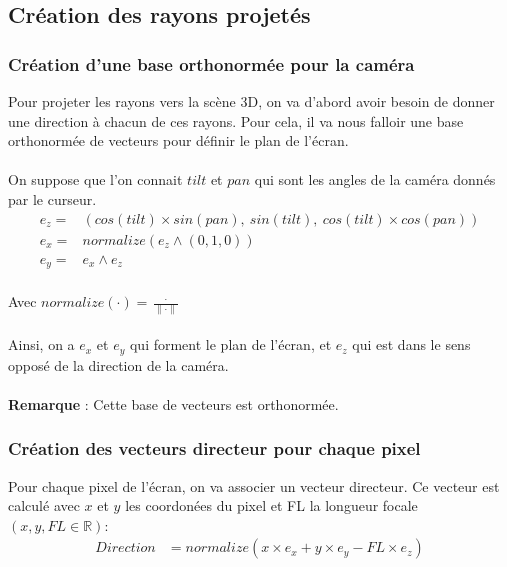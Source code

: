 \newpage
\subsection{Création des rayons projetés}
\subsubsection{Création d'une base orthonormée pour la caméra}
Pour projeter les rayons vers la scène 3D, on va d'abord avoir besoin de donner une direction à chacun de ces rayons. Pour cela, il va nous falloir une base orthonormée de vecteurs pour définir le plan de l'écran.
\\
\\ 
On suppose que l'on connait $tilt$ et $pan$ qui sont les angles de la caméra donnés par le curseur. 
\begin{align*}
    e_z =&  (cos(tilt)\times sin(pan) ,\ sin(tilt) ,\ cos(tilt)\times cos(pan))\\
    e_x =&  normalize(e_z \wedge (0,1,0) )\\
    e_y =& e_x \wedge e_z\\
\end{align*}

Avec $normalize(\cdot ) = \frac{\cdot }{\| \cdot  \|}$\\ \\  
Ainsi, on a $e_x$ et $e_y$ qui forment le plan de l'écran, et $e_z$ qui est dans le sens opposé de la direction de la caméra.\\ \\ 
\textbf{Remarque} : Cette base de vecteurs est orthonormée.

\subsubsection{Création des vecteurs directeur pour chaque pixel}
Pour chaque pixel de l'écran, on va associer un vecteur directeur. Ce vecteur est calculé avec $x$ et $y$ les coordonées du pixel et FL la longueur focale $(x,y,FL\in \mathbb{R})$: 
\begin{align*}
    Direction &= normalize(x\times e_x + y\times e_y - FL\times e_z)\\
\end{align*}

